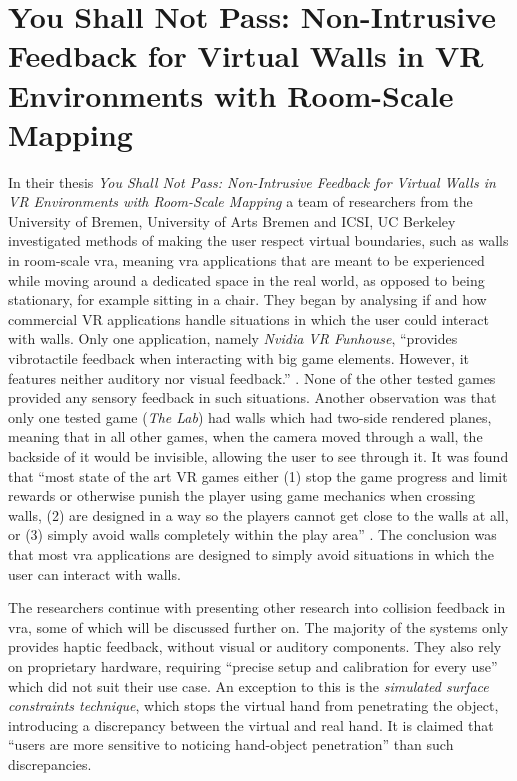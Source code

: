 \section{You Shall Not Pass: Non-Intrusive Feedback for Virtual Walls in VR Environments with Room-Scale Mapping}

In their thesis \textit{You Shall Not Pass: Non-Intrusive Feedback for Virtual Walls in VR Environments with Room-Scale Mapping} \autocite{nonIntrusiveFeedback} a team of researchers from the University of Bremen, University of Arts Bremen and ICSI, UC Berkeley investigated methods of making the user respect virtual boundaries, such as walls in room-scale \gls{vra}, meaning \gls{vra} applications that are meant to be experienced while moving around a dedicated space in the real world, as opposed to being stationary, for example sitting in a chair.
\newline
They began by analysing if and how commercial VR applications handle situations in which the user could interact with walls. Only one application, namely \textit{Nvidia VR Funhouse}, \enquote{provides vibrotactile feedback when interacting with big game elements. However, it features neither auditory nor visual feedback.} \autocite[p. ~1]{nonIntrusiveFeedback}. None of the other tested games provided any sensory feedback in such situations.
\newline
Another observation was that only one tested game (\textit{The Lab}) had walls which had two-side rendered planes, meaning that in all other games, when the camera moved through a wall, the backside of it would be invisible, allowing the user to see through it.
\newline
It was found that \enquote{most state of the art VR
games either (1) stop the game progress and limit rewards or
otherwise punish the player using game mechanics when crossing
walls, (2) are designed in a way so the players cannot get close to
the walls at all, or (3) simply avoid walls completely within the play
area} \autocite[p. ~2]{nonIntrusiveFeedback}. The conclusion was that most \gls{vra} applications are designed to simply avoid situations in which the user can interact with walls.
\newline

The researchers continue with presenting other research into collision feedback in \gls{vra}, some of which will be discussed further on.
\newline
The majority of the systems only provides haptic feedback, without visual or auditory components. They also rely on proprietary hardware, requiring \enquote{precise setup and calibration for every use} \autocite[p. ~2]{nonIntrusiveFeedback} which did not suit their use case. An exception to this is the \textit{simulated surface constraints technique}, which stops the virtual hand from penetrating the object, introducing a discrepancy between the virtual and real hand. It is claimed that \enquote{users are more sensitive to noticing hand-object penetration} \autocite[p. ~3]{nonIntrusiveFeedback} than such discrepancies.
\newline

